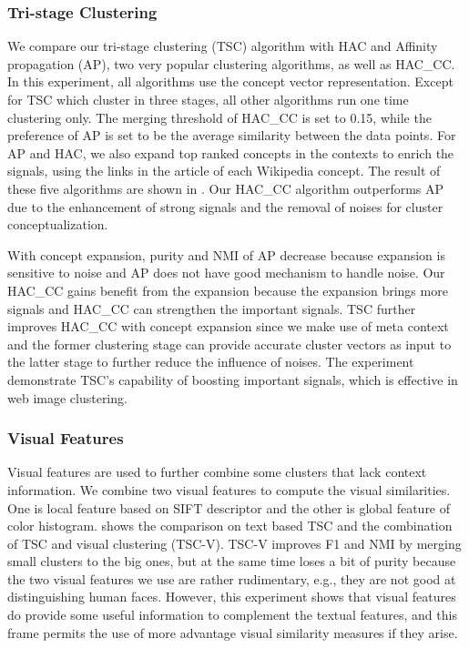 \subsubsection{Tri-stage Clustering}
We compare our tri-stage clustering (TSC) algorithm with
HAC and Affinity propagation (AP), two very popular clustering algorithms,
as well as HAC\_CC.
In this experiment, all algorithms use the concept vector representation.
Except for TSC which cluster in three stages,
all other algorithms run one time clustering only.
The merging threshold of HAC\_CC is set to 0.15, while
the preference of AP is set to be the average similarity between
the data points. For AP and HAC, we also expand top ranked concepts in
the contexts to enrich the signals, using the links in the article of each
Wikipedia concept. The result of these five algorithms are shown in
. Our HAC\_CC algorithm outperforms AP due
to the enhancement of strong signals and the removal of noises for
cluster conceptualization.

With concept expansion, purity and NMI of AP decrease because expansion is
sensitive to noise and AP does not have good mechanism to handle noise.
Our HAC\_CC gains benefit from the expansion because the expansion brings
more signals and HAC\_CC can strengthen the important signals.
TSC further improves HAC\_CC with concept expansion
since we make use of meta context and
the former clustering stage can provide accurate cluster vectors
as input to the latter stage to further reduce the influence of noises.
The experiment demonstrate TSC's capability of boosting important
signals, which is effective in web image clustering.

\subsubsection{Visual Features}
Visual features are used to further combine some clusters that lack
context information. We combine two visual features to compute the visual
similarities. One is local feature based on SIFT descriptor and the other is
global feature of color histogram.  shows the
comparison on text based TSC and the combination of TSC and visual clustering (TSC-V).
TSC-V improves F1 and NMI by merging small clusters to the big ones, but
at the same time loses a bit of purity because the two visual features we use
are rather rudimentary, e.g., they are not good at distinguishing human faces.
However, this experiment shows that visual features do provide some useful information
to complement the textual features, and this frame permits the use of more
advantage visual similarity measures if they arise.


